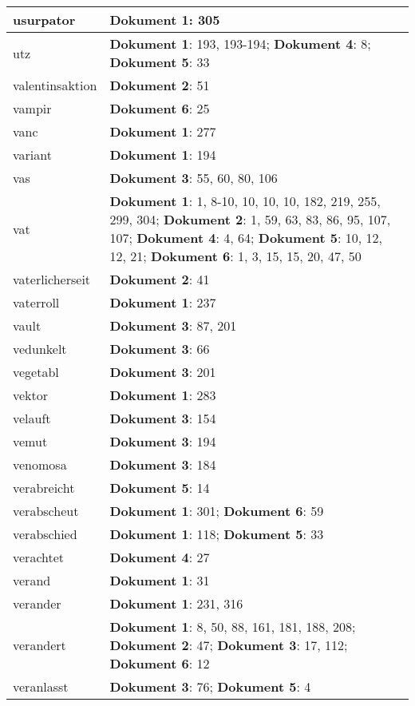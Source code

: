\documentclass[a5paper]{article}
\begin{document}
\begin{longtable}[l]{|l|p{3in}|}
\hline
usurpator & \textbf{Dokument 1}: 305 \\
\hline
utz & \textbf{Dokument 1}: 193, 193-194; \textbf{Dokument 4}: 8; \textbf{Dokument 5}: 33 \\
\hline
valentinsaktion & \textbf{Dokument 2}: 51 \\
\hline
vampir & \textbf{Dokument 6}: 25 \\
\hline
vanc & \textbf{Dokument 1}: 277 \\
\hline
variant & \textbf{Dokument 1}: 194 \\
\hline
vas & \textbf{Dokument 3}: 55, 60, 80, 106 \\
\hline
vat & \textbf{Dokument 1}: 1, 8-10, 10, 10, 10, 182, 219, 255, 299, 304; \textbf{Dokument 2}: 1, 59, 63, 83, 86, 95, 107, 107; \textbf{Dokument 4}: 4, 64; \textbf{Dokument 5}: 10, 12, 12, 21; \textbf{Dokument 6}: 1, 3, 15, 15, 20, 47, 50 \\
\hline
vaterlicherseit & \textbf{Dokument 2}: 41 \\
\hline
vaterroll & \textbf{Dokument 1}: 237 \\
\hline
vault & \textbf{Dokument 3}: 87, 201 \\
\hline
vedunkelt & \textbf{Dokument 3}: 66 \\
\hline
vegetabl & \textbf{Dokument 3}: 201 \\
\hline
vektor & \textbf{Dokument 1}: 283 \\
\hline
velauft & \textbf{Dokument 3}: 154 \\
\hline
vemut & \textbf{Dokument 3}: 194 \\
\hline
venomosa & \textbf{Dokument 3}: 184 \\
\hline
verabreicht & \textbf{Dokument 5}: 14 \\
\hline
verabscheut & \textbf{Dokument 1}: 301; \textbf{Dokument 6}: 59 \\
\hline
verabschied & \textbf{Dokument 1}: 118; \textbf{Dokument 5}: 33 \\
\hline
verachtet & \textbf{Dokument 4}: 27 \\
\hline
verand & \textbf{Dokument 1}: 31 \\
\hline
verander & \textbf{Dokument 1}: 231, 316 \\
\hline
verandert & \textbf{Dokument 1}: 8, 50, 88, 161, 181, 188, 208; \textbf{Dokument 2}: 47; \textbf{Dokument 3}: 17, 112; \textbf{Dokument 6}: 12 \\
\hline
veranlasst & \textbf{Dokument 3}: 76; \textbf{Dokument 5}: 4 \\

\end{longtable}
\end{document}
